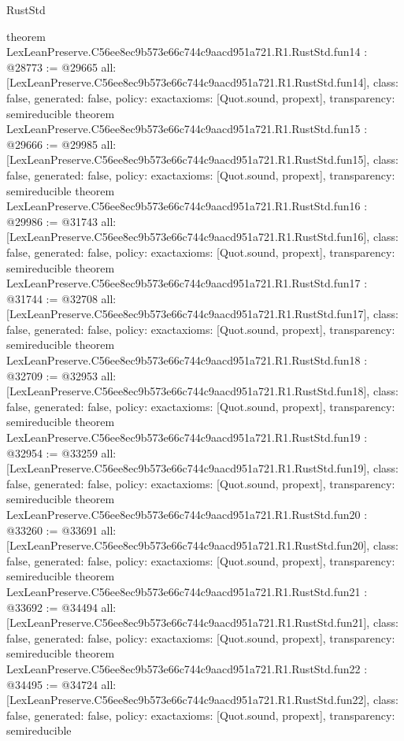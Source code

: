 \begin{lexlean}{RustStd}
\begin{coremodule}
{}
theorem LexLeanPreserve.C56ee8ec9b573e66c744c9aacd951a721.R1.RustStd.fun14 : @28773 := @29665 {
  all: [LexLeanPreserve.C56ee8ec9b573e66c744c9aacd951a721.R1.RustStd.fun14],
  class: false,
  generated: false,
  policy: exact{axioms: [Quot.sound, propext]},
  transparency: semireducible
}
theorem LexLeanPreserve.C56ee8ec9b573e66c744c9aacd951a721.R1.RustStd.fun15 : @29666 := @29985 {
  all: [LexLeanPreserve.C56ee8ec9b573e66c744c9aacd951a721.R1.RustStd.fun15],
  class: false,
  generated: false,
  policy: exact{axioms: [Quot.sound, propext]},
  transparency: semireducible
}
theorem LexLeanPreserve.C56ee8ec9b573e66c744c9aacd951a721.R1.RustStd.fun16 : @29986 := @31743 {
  all: [LexLeanPreserve.C56ee8ec9b573e66c744c9aacd951a721.R1.RustStd.fun16],
  class: false,
  generated: false,
  policy: exact{axioms: [Quot.sound, propext]},
  transparency: semireducible
}
theorem LexLeanPreserve.C56ee8ec9b573e66c744c9aacd951a721.R1.RustStd.fun17 : @31744 := @32708 {
  all: [LexLeanPreserve.C56ee8ec9b573e66c744c9aacd951a721.R1.RustStd.fun17],
  class: false,
  generated: false,
  policy: exact{axioms: [Quot.sound, propext]},
  transparency: semireducible
}
theorem LexLeanPreserve.C56ee8ec9b573e66c744c9aacd951a721.R1.RustStd.fun18 : @32709 := @32953 {
  all: [LexLeanPreserve.C56ee8ec9b573e66c744c9aacd951a721.R1.RustStd.fun18],
  class: false,
  generated: false,
  policy: exact{axioms: [Quot.sound, propext]},
  transparency: semireducible
}
theorem LexLeanPreserve.C56ee8ec9b573e66c744c9aacd951a721.R1.RustStd.fun19 : @32954 := @33259 {
  all: [LexLeanPreserve.C56ee8ec9b573e66c744c9aacd951a721.R1.RustStd.fun19],
  class: false,
  generated: false,
  policy: exact{axioms: [Quot.sound, propext]},
  transparency: semireducible
}
theorem LexLeanPreserve.C56ee8ec9b573e66c744c9aacd951a721.R1.RustStd.fun20 : @33260 := @33691 {
  all: [LexLeanPreserve.C56ee8ec9b573e66c744c9aacd951a721.R1.RustStd.fun20],
  class: false,
  generated: false,
  policy: exact{axioms: [Quot.sound, propext]},
  transparency: semireducible
}
theorem LexLeanPreserve.C56ee8ec9b573e66c744c9aacd951a721.R1.RustStd.fun21 : @33692 := @34494 {
  all: [LexLeanPreserve.C56ee8ec9b573e66c744c9aacd951a721.R1.RustStd.fun21],
  class: false,
  generated: false,
  policy: exact{axioms: [Quot.sound, propext]},
  transparency: semireducible
}
theorem LexLeanPreserve.C56ee8ec9b573e66c744c9aacd951a721.R1.RustStd.fun22 : @34495 := @34724 {
  all: [LexLeanPreserve.C56ee8ec9b573e66c744c9aacd951a721.R1.RustStd.fun22],
  class: false,
  generated: false,
  policy: exact{axioms: [Quot.sound, propext]},
  transparency: semireducible
}
\end{coremodule}
\end{lexlean}
